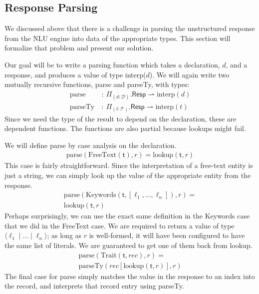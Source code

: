 \documentclass[twocolumn]{article}
\newcommand{\fcy}[1]{\mathcal{#1}}
\newcommand{\etag}[1]{\textsf{#1}}
\begin{document}
\subsection{Response Parsing}
We discussed above that there is a challenge in parsing the unstructured
response from the NLU engine into data of the appropriate types. This section
will formalize that problem and present our solution.

Our goal will be to write a parsing function which takes a declaration, $d$, and
a response, and produces a value of type interp($d$). We will again write two
mutually recursive functions, parse and parseTy, with types:
\begin{align*}
\text{parse}\ &:\ \Pi_{(d : \fcy{D})}. \textsf{Resp} \rightharpoonup \text{interp}(d) \\
\text{parseTy}\ &:\ \Pi_{(t : \fcy{T})}. \textsf{Resp} \rightharpoonup \text{interp}(t)
\end{align*}
Since we need the type of the result to depend on the declaration, these are
dependent functions. The functions are also partial because lookups might fail.

We will define parse by case analysis on the declaration.
\begin{align*}
  \text{parse}(\text{FreeText}(\etag{t}), r) = \text{lookup}(\etag{t}, r)
\end{align*}
This case is fairly straightforward. Since the interpretation of a free-text
entity is just a string, we can simply look up the value of the appropriate
entity from the response.
\begin{align*}
  \text{parse}(\text{Keywords}(\etag{t}, [\ell_1, \dots, \ell_n]), r) =\\
  \text{lookup}(\etag{t}, r)
\end{align*}
Perhaps surprisingly, we can use the exact same definition in the Keywords case
that we did in the FreeText case. We are required to return a value of type
$\langle {\ell_1 \mid \dots \mid \ell_n} \rangle$; as long as $r$ is
well-formed, it will have been configured to have the same list of literals. We
are guaranteed to get one of them back from lookup.
\begin{align*}
  \text{parse}(\text{Trait}(\etag{t}, rec), r) = \\
  \text{parseTy}(rec[\text{lookup}(\etag{t}, r)], r)
\end{align*}
The final case for parse simply matches the value in the response to an index
into the record, and interprets that record entry using parseTy.
\end{document}
